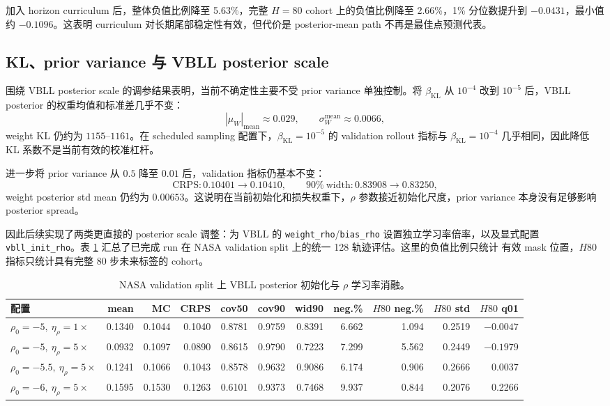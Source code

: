 \documentclass[11pt,a4paper,fontset=none]{ctexart}
\begin{document}
加入 horizon curriculum 后，整体负值比例降至 5.63\%，完整 $H=80$ cohort 上的负值比例降至 2.66\%，1\% 分位数提升到 $-0.0431$，最小值约 $-0.1096$。这表明 curriculum 对长期尾部稳定性有效，但代价是 posterior-mean path 不再是最佳点预测代表。

\subsection{KL、prior variance 与 VBLL posterior scale}

围绕 VBLL posterior scale 的调参结果表明，当前不确定性主要不受 prior variance 单独控制。将 $\beta_{\mathrm{KL}}$ 从 $10^{-4}$ 改到 $10^{-5}$ 后，VBLL posterior 的权重均值和标准差几乎不变：
\[
|\mu_W|_{\mathrm{mean}}\approx 0.029,\qquad
\sigma_W^{\mathrm{mean}}\approx 0.0066,
\]
weight KL 仍约为 $1155$--$1161$。在 scheduled sampling 配置下，$\beta_{\mathrm{KL}}=10^{-5}$ 的 validation rollout 指标与 $\beta_{\mathrm{KL}}=10^{-4}$ 几乎相同，因此降低 KL 系数不是当前有效的校准杠杆。

进一步将 prior variance 从 $0.5$ 降至 $0.01$ 后，validation 指标仍基本不变：
\[
\mathrm{CRPS}: 0.10401\rightarrow 0.10410,\qquad
90\%\ \mathrm{width}: 0.83908\rightarrow 0.83250,
\]
weight posterior std mean 仍约为 $0.00653$。这说明在当前初始化和损失权重下，$\rho$ 参数接近初始化尺度，prior variance 本身没有足够影响 posterior spread。

因此后续实现了两类更直接的 posterior scale 调整：为 VBLL 的
\texttt{weight\_rho}/\texttt{bias\_rho} 设置独立学习率倍率，以及显式配置
\texttt{vbll\_init\_rho}。表 \ref{tab:nasa_rho_ablation} 汇总了已完成 run
在 NASA validation split 上的统一 128 轨迹评估。这里的负值比例只统计
有效 mask 位置，$H80$ 指标只统计具有完整 80 步未来标签的 cohort。

\begin{table}[h]
\centering
\scriptsize
\setlength{\tabcolsep}{2.5pt}
\begin{tabular}{lrrrrrrrrrr}
\toprule
配置 & mean & MC & CRPS & cov50 & cov90 & wid90 & neg.\% & $H80$ neg.\% & $H80$ std & $H80$ q01 \\
\midrule
$\rho_0=-5,\ \eta_\rho=1\times$
& 0.1340 & 0.1044 & 0.1040 & 0.8781 & 0.9759 & 0.8391 & 6.662 & 1.094 & 0.2519 & $-0.0047$ \\
$\rho_0=-5,\ \eta_\rho=5\times$
& 0.0932 & 0.1097 & 0.0890 & 0.8615 & 0.9790 & 0.7223 & 7.299 & 5.562 & 0.2449 & $-0.1979$ \\
$\rho_0=-5.5,\ \eta_\rho=5\times$
& 0.1241 & 0.1066 & 0.1043 & 0.8578 & 0.9632 & 0.9086 & 6.174 & 0.906 & 0.2666 & 0.0037 \\
$\rho_0=-6,\ \eta_\rho=5\times$
& 0.1595 & 0.1530 & 0.1263 & 0.6101 & 0.9373 & 0.7468 & 9.937 & 0.844 & 0.2076 & 0.2266 \\
\bottomrule
\end{tabular}
\caption{NASA validation split 上 VBLL posterior 初始化与 $\rho$ 学习率消融。}
\label{tab:nasa_rho_ablation}
\end{table}
\end{document}
